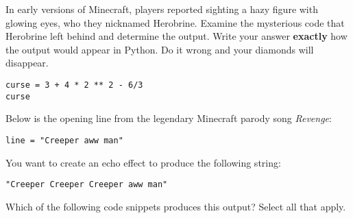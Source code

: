 \documentclass[twoside,12pt]{article}
\begin{document}
\begin{probset}
\begin{prob}
    \smallskip


    \smallskip
    

    \smallskip

    \smallskip


    \smallskip


\end{prob}

\bigskip

\begin{prob}
    In early versions of Minecraft, players reported sighting a hazy figure with glowing eyes, who they nicknamed Herobrine. Examine the mysterious code that Herobrine left behind and determine the output. Write your answer \textbf{exactly} how the output would appear in Python. Do it wrong and your diamonds will disappear. 

    \noindent
\begin{minipage}{.5\textwidth}
\noindent 
    \begin{verbatim}
curse = 3 + 4 * 2 ** 2 - 6/3
curse
    \end{verbatim}
    \end{minipage}%
    \begin{minipage}{0.45\textwidth}
        \centering
    \end{minipage}
    
\end{prob}

\bigskip

\begin{prob}
    Below is the opening line from the legendary Minecraft parody song \emph{Revenge}:
    \begin{verbatim}
line = "Creeper aww man"
    \end{verbatim}  
    You want to create an echo effect to produce the following string:
    \begin{verbatim}
"Creeper Creeper Creeper aww man"
    \end{verbatim}  
Which of the following code snippets produces this output? Select all that apply.
    

\end{prob}
\end{probset}
\end{document}
